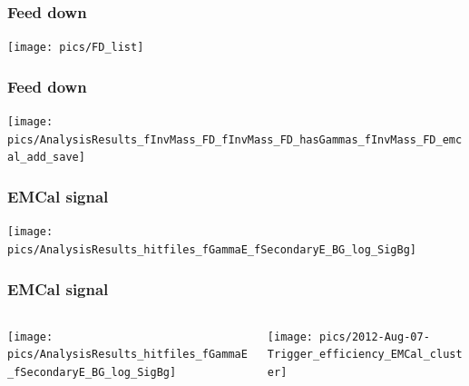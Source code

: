 \documentclass{beamer}
\begin{document}

\begin{frame}
    \frametitle{Feed down}
    \centering\texttt{[image: pics/FD\_list]}%
\end{frame}


\begin{frame}
    \frametitle{Feed down}
    \centering\texttt{[image: pics/AnalysisResults\_fInvMass\_FD\_fInvMass\_FD\_hasGammas\_fInvMass\_FD\_emcal\_add\_save]}%
\end{frame}


\begin{frame}
    \frametitle{EMCal signal}
    \centering\texttt{[image: pics/AnalysisResults\_hitfiles\_fGammaE\_fSecondaryE\_BG\_log\_SigBg]}%
\end{frame}


\begin{frame}
    \frametitle{EMCal signal}
    \vspace*{3mm}
    \begin{columns}[T] %
        \begin{column}{.48\textwidth}
            \centering\texttt{[image: pics/AnalysisResults\_hitfiles\_fGammaE\_fSecondaryE\_BG\_log\_SigBg]}%
        \end{column}%
        \hfill%
        \begin{column}{.48\textwidth}
            \centering\texttt{[image: pics/2012-Aug-07-Trigger\_efficiency\_EMCal\_cluster]}%
        \end{column}%
    \end{columns}
\end{frame}




\end{document}
